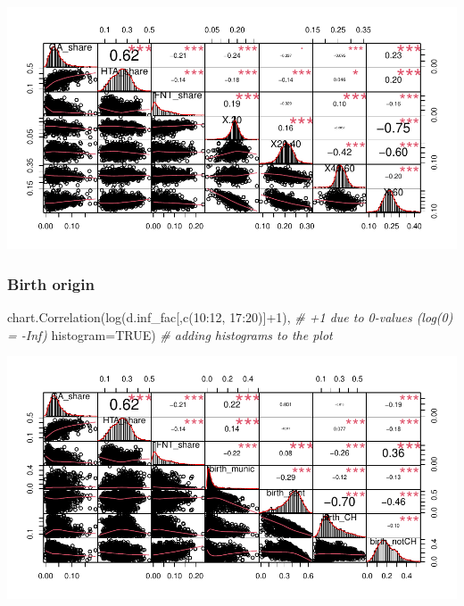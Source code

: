 \documentclass[
]{article}
\newenvironment{Shaded}{\begin{snugshade}}{\end{snugshade}}
\newcommand{\AttributeTok}[1]{\textcolor[rgb]{0.77,0.63,0.00}{#1}}
\newcommand{\CommentTok}[1]{\textcolor[rgb]{0.56,0.35,0.01}{\textit{#1}}}
\newcommand{\ConstantTok}[1]{\textcolor[rgb]{0.00,0.00,0.00}{#1}}
\newcommand{\DecValTok}[1]{\textcolor[rgb]{0.00,0.00,0.81}{#1}}
\newcommand{\FunctionTok}[1]{\textcolor[rgb]{0.00,0.00,0.00}{#1}}
\newcommand{\NormalTok}[1]{#1}
\newcommand{\SpecialCharTok}[1]{\textcolor[rgb]{0.00,0.00,0.00}{#1}}
\begin{document}
\includegraphics{Lin_Mod_Clus_Anal_files/figure-latex/unnamed-chunk-6-1.pdf}

\hypertarget{birth-origin}{%
\subsubsection{Birth origin}\label{birth-origin}}

\begin{Shaded}
\begin{Highlighting}[]
\FunctionTok{chart.Correlation}\NormalTok{(}\FunctionTok{log}\NormalTok{(d.inf\_fac[,}\FunctionTok{c}\NormalTok{(}\DecValTok{10}\SpecialCharTok{:}\DecValTok{12}\NormalTok{, }\DecValTok{17}\SpecialCharTok{:}\DecValTok{20}\NormalTok{)]}\SpecialCharTok{+}\DecValTok{1}\NormalTok{), }\CommentTok{\# +1 due to 0{-}values (log(0) = {-}Inf)}
                  \AttributeTok{histogram=}\ConstantTok{TRUE}\NormalTok{) }\CommentTok{\# adding histograms to the plot}
\end{Highlighting}
\end{Shaded}

\includegraphics{Lin_Mod_Clus_Anal_files/figure-latex/unnamed-chunk-7-1.pdf}
\end{document}
